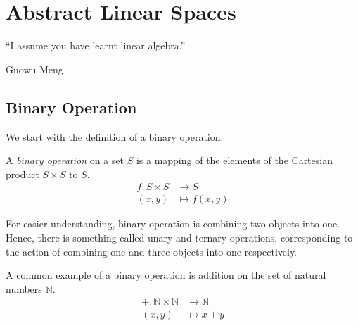 \documentclass[
	11pt, %
	fleqn, %
	a4paper, %
]{LegrandOrangeBook}
\begin{document}

\chapterspaceabove{8cm} %
\chapterspacebelow{8cm} %

\chapter{Abstract Linear Spaces}

\epigraph{``I assume you have learnt linear algebra.''}{Guowu Meng}

\section{Binary Operation}

We start with the definition of a binary operation.

\begin{definition}
    A \emph{binary operation} on a set $S$ is a mapping of the elements of the Cartesian product $S \times S$ to $S$.
    \[ \begin{split}
            f : S \times S & \to S \\ (x,y) &\mapsto f(x,y)
        \end{split}\]
\end{definition}

For easier understanding, binary operation is combining two objects into one. Hence, there is something called unary and ternary operations, corresponding to the action of combining one and three objects into one respectively.

\begin{example}
    A common example of a binary operation is addition on the set of natural numbers $\mathbb{N}$.
    \begin{equation}
        \begin{split}
            + : \mathbb{N} \times \mathbb{N} & \to \mathbb{N} \\ (x,y) &\mapsto x+y
        \end{split}
    \end{equation}
\end{example}
\end{document}

